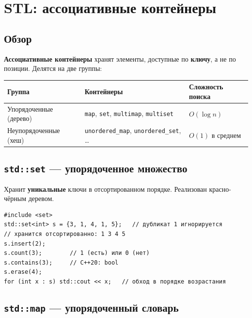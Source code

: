 
\section{STL: ассоциативные контейнеры}

\subsection{Обзор}

\textbf{Ассоциативные контейнеры} хранят элементы, доступные по \textbf{ключу}, а
не по позиции. Делятся на две группы:

\begin{center}
\begin{tabular}{lll}
\toprule
\textbf{Группа} & \textbf{Контейнеры} & \textbf{Сложность поиска} \\
\midrule
Упорядоченные (дерево) & \texttt{map}, \texttt{set}, \texttt{multimap}, \texttt{multiset} & $O(\log n)$ \\
\addlinespace
Неупорядоченные (хеш) & \texttt{unordered\_map}, \texttt{unordered\_set}, \dots & $O(1)$ в среднем \\
\bottomrule
\end{tabular}
\end{center}

\subsection{\texttt{std::set} --- упорядоченное множество}

Хранит \textbf{уникальные} ключи в отсортированном порядке. Реализован
красно-чёрным деревом.

\begin{lstlisting}
#include <set>
std::set<int> s = {3, 1, 4, 1, 5};   // дубликат 1 игнорируется
// хранится отсортированно: 1 3 4 5
s.insert(2);
s.count(3);        // 1 (есть) или 0 (нет)
s.contains(3);     // C++20: bool
s.erase(4);
for (int x : s) std::cout << x;   // обход в порядке возрастания
\end{lstlisting}

\subsection{\texttt{std::map} --- упорядоченный словарь}

